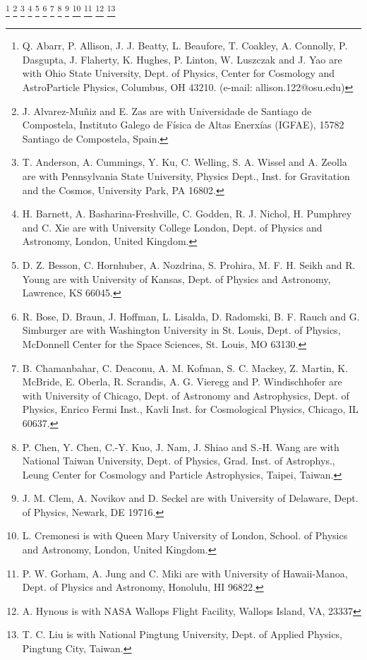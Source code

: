 \thanks{Q. Abarr, P. Allison, J. J. Beatty, L. Beaufore, T. Coakley, A. Connolly, P. Dasgupta, J. Flaherty, K. Hughes, P. Linton, W. Luszczak and J. Yao are with Ohio State University, Dept. of Physics, Center for Cosmology and AstroParticle Physics, Columbus, OH 43210. (e-mail: allison.122@osu.edu)}
\thanks{J. Alvarez-Mu\~niz and E. Zas are with Universidade de Santiago de Compostela, Instituto Galego de F\'isica de Altas Enerx\'ias (IGFAE), 15782 Santiago de Compostela, Spain.}
\thanks{T. Anderson, A. Cummings, Y. Ku, C. Welling, S. A. Wissel and A. Zeolla are with Pennsylvania State University, Physics Dept., Inst. for Gravitation and the Cosmos, University Park, PA 16802.}
\thanks{H. Barnett, A. Basharina-Freshville, C. Godden, R. J. Nichol, H. Pumphrey and C. Xie are with University College London, Dept. of Physics and Astronomy, London, United Kingdom.}
\thanks{D. Z. Besson, C. Hornhuber, A. Nozdrina, S. Prohira, M. F. H. Seikh and R. Young are with University of Kansas, Dept. of Physics and Astronomy, Lawrence, KS 66045.}
\thanks{R. Bose, D. Braun, J. Hoffman, L. Lisalda, D. Radomski, B. F. Rauch and G. Simburger are with Washington University in St. Louis, Dept. of Physics, McDonnell Center for the Space Sciences, St. Louis, MO 63130.}
\thanks{B. Chamanbahar, C. Deaconu, A. M. Kofman, S. C. Mackey, Z. Martin, K. McBride, E. Oberla, R. Scrandis, A. G. Vieregg and P. Windischhofer are with University of Chicago, Dept. of Astronomy and Astrophysics, Dept. of Physics, Enrico Fermi Inst., Kavli Inst. for Cosmological Physics, Chicago, IL 60637.}
\thanks{P. Chen, Y. Chen, C.-Y. Kuo, J. Nam, J. Shiao and S.-H. Wang are with National Taiwan University, Dept. of Physics, Grad. Inst. of Astrophys., Leung Center for Cosmology and Particle Astrophysics, Taipei, Taiwan.}
\thanks{J. M. Clem, A. Novikov and D. Seckel are with University of Delaware, Dept. of Physics, Newark, DE 19716.}
\thanks{L. Cremonesi is with Queen Mary University of London, School. of Physics and Astronomy, London, United Kingdom.}
\thanks{P. W. Gorham, A. Jung and C. Miki are with University of Hawaii-Manoa, Dept. of Physics and Astronomy, Honolulu, HI 96822.}
\thanks{A. Hynous is with NASA Wallops Flight Facility, Wallops Island, VA, 23337}
\thanks{T. C. Liu is with National Pingtung University, Dept. of Applied Physics, Pingtung City, Taiwan.}
